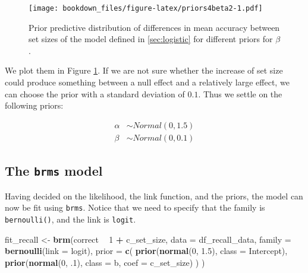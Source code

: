 \documentclass[12pt,]{krantz}
\newenvironment{Shaded}{\begin{snugshade}}{\end{snugshade}}
\newcommand{\KeywordTok}[1]{\textcolor[rgb]{0.13,0.29,0.53}{\textbf{#1}}}
\newcommand{\DataTypeTok}[1]{\textcolor[rgb]{0.13,0.29,0.53}{#1}}
\newcommand{\DecValTok}[1]{\textcolor[rgb]{0.00,0.00,0.81}{#1}}
\newcommand{\FloatTok}[1]{\textcolor[rgb]{0.00,0.00,0.81}{#1}}
\newcommand{\StringTok}[1]{\textcolor[rgb]{0.31,0.60,0.02}{#1}}
\newcommand{\OperatorTok}[1]{\textcolor[rgb]{0.81,0.36,0.00}{\textbf{#1}}}
\newcommand{\NormalTok}[1]{#1}
\theoremstyle{definition}
\theoremstyle{definition}
\theoremstyle{definition}
\theoremstyle{remark}
\begin{document}
\begin{figure}
\centering
\texttt{[image: bookdown\_files/figure-latex/priors4beta2-1.pdf]}
\caption{\label{fig:priors4beta2}Prior predictive distribution of differences in mean
accuracy between set sizes of the model defined in \ref{sec:logistic}
for different priors for \(\beta\).}
\end{figure}

We plot them in Figure \ref{fig:priors4beta2}. If we are not sure
whether the increase of set size could produce something between a null
effect and a relatively large effect, we can choose the prior with a
standard deviation of \(0.1\). Thus we settle on the following priors:

\begin{equation}
\begin{aligned}
\alpha &\sim Normal(0, 1.5) \\
\beta &\sim Normal(0, 0.1) 
\end{aligned}
\end{equation}

\subsection{\texorpdfstring{The \texttt{brms}
model}{The brms model}}\label{the-brms-model-2}

Having decided on the likelihood, the link function, and the priors, the
model can now be fit using \texttt{brms}. Notice that we need to specify
that the family is \texttt{bernoulli()}, and the link is \texttt{logit}.

\begin{Shaded}
\begin{Highlighting}[]
\NormalTok{fit_recall <-}\StringTok{ }\KeywordTok{brm}\NormalTok{(correct }\OperatorTok{~}\StringTok{ }\DecValTok{1} \OperatorTok{+}\StringTok{ }\NormalTok{c_set_size,}
  \DataTypeTok{data =}\NormalTok{ df_recall_data,}
  \DataTypeTok{family =} \KeywordTok{bernoulli}\NormalTok{(}\DataTypeTok{link =}\NormalTok{ logit),}
  \DataTypeTok{prior =} \KeywordTok{c}\NormalTok{(}
    \KeywordTok{prior}\NormalTok{(}\KeywordTok{normal}\NormalTok{(}\DecValTok{0}\NormalTok{, }\FloatTok{1.5}\NormalTok{), }\DataTypeTok{class =}\NormalTok{ Intercept),}
    \KeywordTok{prior}\NormalTok{(}\KeywordTok{normal}\NormalTok{(}\DecValTok{0}\NormalTok{, }\FloatTok{.1}\NormalTok{), }\DataTypeTok{class =}\NormalTok{ b, }\DataTypeTok{coef =}\NormalTok{ c_set_size)}
\NormalTok{  )}
\NormalTok{)}
\end{Highlighting}
\end{Shaded}
\end{document}

